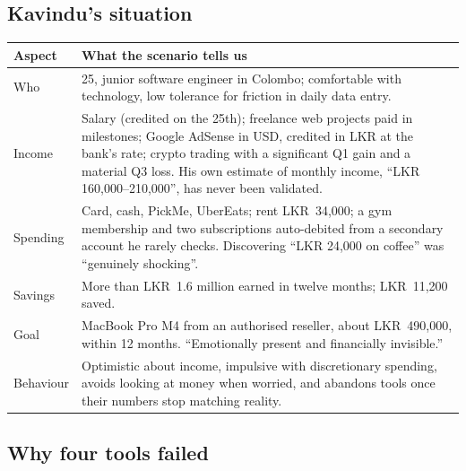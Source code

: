 \documentclass[11pt,a4paper]{article}
\newcommand{\lkr}[1]{LKR~#1}
\begin{document}
\subsection{Kavindu's situation}
\begin{tabularx}{\textwidth}{|>{\raggedright\arraybackslash}p{3.4cm}|L|}
\hline
\textbf{Aspect} & \textbf{What the scenario tells us}\\
\hline
Who & 25, junior software engineer in Colombo; comfortable with technology, low tolerance for friction in daily data entry.\\
Income & Salary (credited on the 25th); freelance web projects paid in milestones; Google AdSense in USD, credited in LKR at the bank's rate; crypto trading with a significant Q1 gain and a material Q3 loss. His own estimate of monthly income, ``LKR 160,000--210,000'', has never been validated.\\
Spending & Card, cash, PickMe, UberEats; rent \lkr{34,000}; a gym membership and two subscriptions auto-debited from a secondary account he rarely checks. Discovering ``LKR 24,000 on coffee'' was ``genuinely shocking''.\\
Savings & More than \lkr{1.6 million} earned in twelve months; \lkr{11,200} saved.\\
Goal & MacBook Pro M4 from an authorised reseller, about \lkr{490,000}, within 12 months. ``Emotionally present and financially invisible.''\\
Behaviour & Optimistic about income, impulsive with discretionary spending, avoids looking at money when worried, and abandons tools once their numbers stop matching reality.\\
\hline
\end{tabularx}

\subsection{Why four tools failed}
\end{document}

